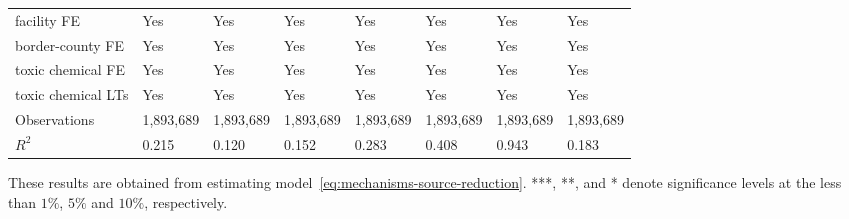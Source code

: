 \begin{table}[H]
{\begin{tabular}{@{}llllllll@{}}
            facility FE        & Yes         & Yes                  & Yes                      & Yes                 & Yes              & Yes       & Yes       \\
            border-county FE   & Yes         & Yes                  & Yes                      & Yes                 & Yes              & Yes       & Yes       \\
            toxic chemical FE  & Yes         & Yes                  & Yes                      & Yes                 & Yes              & Yes       & Yes       \\
            toxic chemical LTs & Yes         & Yes                  & Yes                      & Yes                 & Yes              & Yes       & Yes       \\ \midrule
            Observations       & 1,893,689   & 1,893,689            & 1,893,689                & 1,893,689           & 1,893,689        & 1,893,689 & 1,893,689 \\
            $R^2$              & 0.215       & 0.120                & 0.152                    & 0.283               & 0.408            & 0.943     & 0.183     \\ \bottomrule\bottomrule
        \end{tabular}%
    }
    \begin{minipage}{18cm}
        \vspace{0.05in}
        These results are obtained from estimating model~\ref{eq:mechanisms-source-reduction}. ***, **, and * denote significance levels at the less than $1\%$, $5\%$ and $10\%$, respectively.
    \end{minipage}
\end{table}